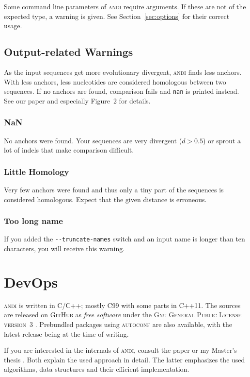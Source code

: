 \documentclass[a4paper,
  10pt,
  english,
  DIV=12,
  BCOR=8mm]{scrbook}
\newcommand{\algo}[1]{\textsc{{#1}}}
\newcommand{\andi}{\algo{andi}\xspace}
\begin{document}
Some command line parameters of \andi require arguments. If these are not of the expected type, a warning is given. See Section~\ref{sec:options} for their correct usage.


\section{Output-related Warnings}

As the input sequences get more evolutionary divergent, \andi finds less anchors. With less anchors, less nucleotides are considered homologous between two sequences. If no anchors are found, comparison fails and \lstinline!nan! is printed instead. See our paper and especially Figure~2 for details.

\subsection*{NaN}

No anchors were found. Your sequences are very divergent ($d>0.5$) or sprout a lot of indels that make comparison difficult.

\subsection*{Little Homology}

Very few anchors were found and thus only a tiny part of the sequences is considered homologous. Expect that the given distance is erroneous.

\subsection*{Too long name}

If you added the \lstinline$--truncate-names$ switch and an input name is longer than ten characters, you will receive this warning.

\chapter{DevOps} %

\andi is written in C/C++; mostly C99 with some parts in C++11. The sources are released on \algo{GitHub} as \emph{free software} under the \textsc{Gnu General Public License version~3} \cite{GPL}. Prebundled packages using \algo{autoconf} are also available, with the latest release being {\version} at the time of writing.

If you are interested in the internals of \algo{andi}, consult the paper \cite{andi} or my Master's thesis \cite{kloetzl}. Both explain the used approach in detail. The latter emphasizes the used algorithms, data structures and their efficient implementation.
\end{document}
